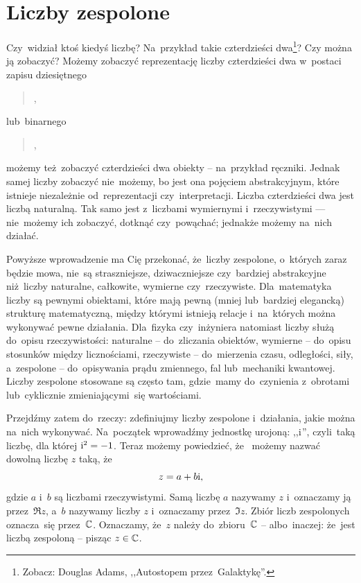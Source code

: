\label{ch:podstawy}
\section{Liczby zespolone}
Czy~widział ktoś kiedyś liczbę? Na~przykład takie czterdzieści
dwa\footnote{Zobacz: Douglas Adams, ,,Autostopem przez~Galaktykę''.}? Czy można ją
zobaczyć? Możemy zobaczyć reprezentację liczby czterdzieści dwa w~postaci zapisu
dziesiętnego
\begin{quotation}
	,
\end{quotation}
lub~binarnego
\begin{quotation}
	,
\end{quotation}
możemy też~zobaczyć czterdzieści dwa obiekty -- na~przykład ręczniki.
Jednak samej liczby zobaczyć nie~możemy, bo jest ona pojęciem abstrakcyjnym, które
istnieje niezależnie od~reprezentacji czy~interpretacji. Liczba czterdzieści dwa
jest liczbą naturalną. Tak samo jest z~liczbami wymiernymi i~rzeczywistymi ---
nie~możemy ich zobaczyć, dotknąć czy~powąchać; jednakże możemy na~nich działać.

Powyższe wprowadzenie ma Cię przekonać, że~liczby zespolone, o~których zaraz
będzie mowa, nie~są straszniejsze, dziwaczniejsze czy~bardziej abstrakcyjne
niż~liczby naturalne, całkowite, wymierne czy~rzeczywiste.
Dla~matematyka liczby są pewnymi obiektami, które mają pewną (mniej lub~bardziej elegancką)
strukturę matematyczną, między którymi istnieją relacje i~na~których można wykonywać pewne działania.
Dla~fizyka czy~inżyniera natomiast liczby służą do~opisu rzeczywistości:
naturalne -- do~zliczania obiektów, wymierne -- do~opisu stosunków między licznościami,
rzeczywiste -- do~mierzenia czasu, odległości, siły, a~zespolone -- do~opisywania prądu zmiennego,
fal lub~mechaniki kwantowej. Liczby zespolone stosowane są często tam, gdzie~mamy do~czynienia
z~obrotami lub~cyklicznie zmieniającymi~się wartościami.

Przejdźmy zatem do~rzeczy: zdefiniujmy liczby zespolone i~działania, jakie można
na~nich wykonywać.
Na~początek wprowadźmy jednostkę urojoną: ,,${\mathrm i}$'', czyli~taką liczbę, dla której ${\mathrm i}^2=-1$.
Teraz możemy powiedzieć, że~
możemy nazwać dowolną liczbę $z$ taką, że
$$
	z = a + b {\mathrm i},
$$
gdzie $a$ i~$b$ są liczbami rzeczywistymi. Samą liczbę $a$ nazywamy
 $z$ i~oznaczamy ją przez~$\Re z$,
a~$b$ nazywamy  
liczby $z$ i~oznaczamy przez~$\Im z$.
Zbiór liczb zespolonych oznacza~się przez~$\mathbb{C}$. Oznaczamy, że~$z$ należy do~zbioru~$\mathbb{C}$
-- albo~inaczej: że~jest liczbą zespoloną -- pisząc $z\in\mathbb{C}$.

